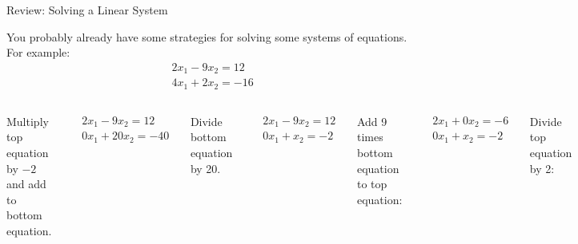 \documentclass[xcolor=dvipsnames,aspectratio=169,t]{beamer}
\begin{document}
\begin{frame}{Review: Solving a Linear System}

  {\small
  You probably already have some strategies for solving some systems of equations. For example:
  \begin{align*}
    & 2x_1 -9x_2 =12 \\
    & 4x_1 +2x_2=-16
  \end{align*} }
  \pause
  
  \vspace{-0.25in}
   
  \begin{columns}[T]

    \column{0.5\tw}
            {\small
              \bb
     \ii Multiply top equation by $-2$ and add to bottom equation.

     \vspace{-0.25in}
   \begin{align*}
      & 2x _1- 9x_2 =12 \\
       & 0x_1 + 20x_2=-40
   \end{align*}

  \ii Divide bottom equation by 20.

     \vspace{-0.25in}
   \begin{align*}
      & 2x_1 -  9x_2 =12 \\
       & 0x_1 + x_2=-2
   \end{align*}
   \ee }
   
     \column{0.5\tw}

     {\small
   \bb
     \addtocounter{enumi}{2}
   \ii Add 9 times bottom equation to top equation:

     \vspace{-0.25in}
\begin{align*}
  & 2x_1 +0x_2 =-6 \\
      & 0x_1 + x_2 =-2
\end{align*}

   \ii Divide top equation by 2:

     \vspace{-0.25in}
\begin{align*}
     & x_1  =-3 \\
      & x_2 =-2
\end{align*}

\ee }

\end{columns}

\end{frame}
\end{document}
